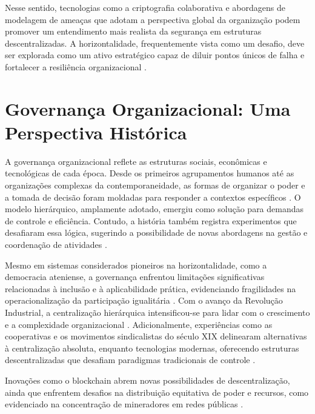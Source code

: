Nesse sentido, tecnologias como a criptografia colaborativa \cite{Colbac,
AbcCrypto} e abordagens de modelagem de ameaças que adotam a perspectiva global
da organização podem promover um entendimento mais realista da segurança em
estruturas descentralizadas. A horizontalidade, frequentemente vista como
um desafio, deve ser explorada como um ativo estratégico capaz de diluir
pontos únicos de falha e fortalecer a resiliência organizacional \cite{EverydayRevolutions}.

\section{Governança Organizacional: Uma Perspectiva Histórica}
\label{sec:contexto_historico}

A governança organizacional reflete as estruturas sociais, econômicas e
tecnológicas de cada época. Desde os primeiros agrupamentos humanos até as
organizações complexas da contemporaneidade, as formas de organizar o poder
e a tomada de decisão foram moldadas para responder a contextos
específicos \cite{Non-HierarchicalForms}. O modelo hierárquico,
amplamente adotado, emergiu como solução para demandas de
controle e eficiência. Contudo, a história também registra
experimentos que desafiaram essa lógica, sugerindo a possibilidade de novas
abordagens na gestão e coordenação de atividades
\cite{WorkerCooperativesinAmerica, WorkerCooperativesandRevolution}.

Mesmo em sistemas considerados pioneiros na horizontalidade, como a
democracia ateniense, a governança enfrentou limitações significativas
relacionadas à inclusão e à aplicabilidade prática, evidenciando
fragilidades na operacionalização da participação igualitária
\cite{AthenianDemocracyABrief}. Com o avanço da Revolução Industrial, a
centralização hierárquica intensificou-se para lidar com o crescimento e a
complexidade organizacional \cite{WorkerCooperativesandRevolution}.
Adicionalmente, experiências como as cooperativas e os movimentos
sindicalistas do século XIX delinearam alternativas à centralização absoluta,
enquanto tecnologias modernas, oferecendo estruturas descentralizadas que desafiam paradigmas
tradicionais de controle \cite{WorkerCooperativesinAmerica, EverydayRevolutions}.

Inovações como o blockchain abrem novas possibilidades de descentralização,
ainda que enfrentem desafios na distribuição equitativa de poder e
recursos, como evidenciado na concentração de mineradores em redes públicas
\cite{Energytheftdetectionissues}.

